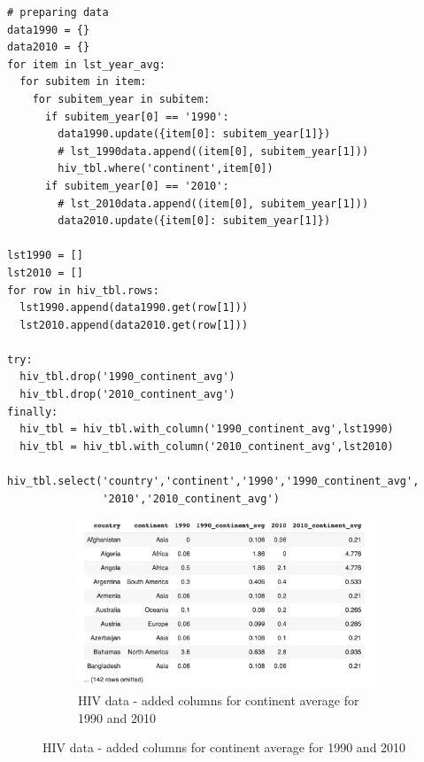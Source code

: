 \documentclass[UTF8, letter]{article}
\begin{document}
\begin{codeblock}
\begin{verbatim}
# preparing data
data1990 = {}
data2010 = {}
for item in lst_year_avg:
  for subitem in item:
    for subitem_year in subitem:
      if subitem_year[0] == '1990':
        data1990.update({item[0]: subitem_year[1]})
        # lst_1990data.append((item[0], subitem_year[1]))
        hiv_tbl.where('continent',item[0])
      if subitem_year[0] == '2010':
        # lst_2010data.append((item[0], subitem_year[1]))      
        data2010.update({item[0]: subitem_year[1]})
  
lst1990 = []
lst2010 = []
for row in hiv_tbl.rows:
  lst1990.append(data1990.get(row[1]))
  lst2010.append(data2010.get(row[1]))

try:
  hiv_tbl.drop('1990_continent_avg')
  hiv_tbl.drop('2010_continent_avg')
finally:
  hiv_tbl = hiv_tbl.with_column('1990_continent_avg',lst1990)
  hiv_tbl = hiv_tbl.with_column('2010_continent_avg',lst2010)

hiv_tbl.select('country','continent','1990','1990_continent_avg',
               '2010','2010_continent_avg')
\end{verbatim}
\end{codeblock}

\begin{figure}
	\centering
	\begin{subfigure}{1\textwidth}
		\centering
		\includegraphics[width=\linewidth]{output_19.png}
		\caption{HIV data - added columns for continent average for 1990 and 2010}
		\label{fig:line1}		
	\end{subfigure}	
\end{figure}
\end{document}
